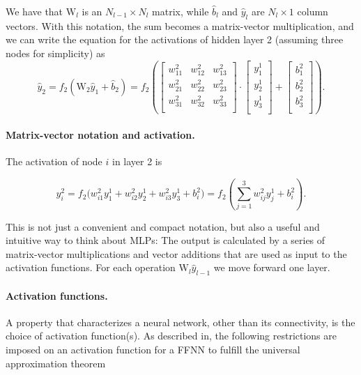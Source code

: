 \documentclass[%
oneside,                 %
final,                   %
10pt]{article}
\begin{document}
We have that $\mathrm{W}_l$ is an $N_{l-1} \times N_l$ matrix, while $\hat{b}_l$ and $\hat{y}_l$ are $N_l \times 1$ column vectors. 
With this notation, the sum becomes a matrix-vector multiplication, and we can write
the equation for the activations of hidden layer 2 (assuming three nodes for simplicity) as
\begin{equation}
 \hat{y}_2 = f_2(\mathrm{W}_2 \hat{y}_{1} + \hat{b}_{2}) = 
 f_2\left(\left[\begin{array}{ccc}
    w^2_{11} &w^2_{12} &w^2_{13} \\
    w^2_{21} &w^2_{22} &w^2_{23} \\
    w^2_{31} &w^2_{32} &w^2_{33} \\
    \end{array} \right] \cdot
    \left[\begin{array}{c}
           y^1_1 \\
           y^1_2 \\
           y^1_3 \\
          \end{array}\right] + 
    \left[\begin{array}{c}
           b^2_1 \\
           b^2_2 \\
           b^2_3 \\
          \end{array}\right]\right).
\end{equation}

\paragraph{Matrix-vector notation  and activation.}
The activation of node $i$ in layer 2 is

\begin{equation}
 y^2_i = f_2\Bigr(w^2_{i1}y^1_1 + w^2_{i2}y^1_2 + w^2_{i3}y^1_3 + b^2_i\Bigr) = 
 f_2\left(\sum_{j=1}^3 w^2_{ij} y_j^1 + b^2_i\right).
\end{equation}

This is not just a convenient and compact notation, but also a useful
and intuitive way to think about MLPs: The output is calculated by a
series of matrix-vector multiplications and vector additions that are
used as input to the activation functions. For each operation
$\mathrm{W}_l \hat{y}_{l-1}$ we move forward one layer.


\paragraph{Activation functions.}
A property that characterizes a neural network, other than its
connectivity, is the choice of activation function(s).  As described
in, the following restrictions are imposed on an activation function
for a FFNN to fulfill the universal approximation theorem
\end{document}
